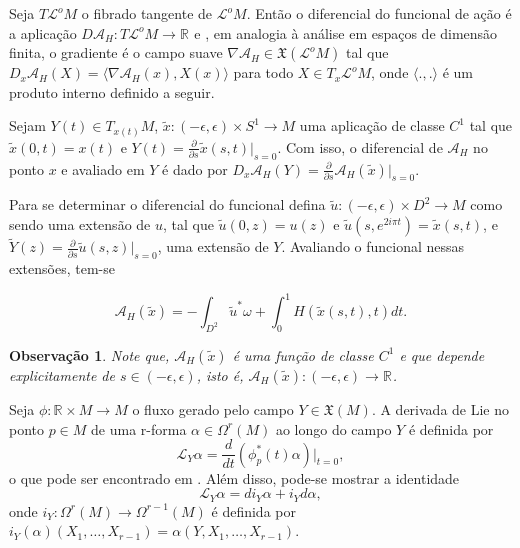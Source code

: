 \documentclass[12pt]{book}
\newtheorem{observacao}[teorema]{Observação}
\newcommand{\campossuaves}[1]{\mathfrak{X}(#1)}
\newcommand{\derivada}[2]{\frac{d #1}{d #2}}
\newcommand{\derivadaparcial}[2]{\frac{\partial #1}{\partial #2}}
\newcommand{\espacotangenteponto}[2]{T_{#1}#2}
\newcommand{\funcionalH}{\mathcal{A}_{H}}
\newcommand{\funcionalHponto}[1]{\mathcal{A}_{H}(#1)}
\newcommand{\gradientefuncional}{\nabla \funcionalH}
\newcommand{\liederivada}[1]{\mathcal{L}_{#1}}
\newcommand{\produtointerno}[2]{\langle #1, #2 \rangle}
\newcommand{\retacartesianovariedade}{\real{} \times M}
\newcommand{\real}[1]{\mathbb{R}^{#1}}
\newcommand{\reta}{\real{}}
\newcommand{\lacocontrateis}{\mathcal{L}^{o}M}
\begin{document}
	Seja $T\lacocontrateis$ o fibrado tangente de $\lacocontrateis$. Então o diferencial do funcional de ação é a aplicação $D\funcionalH: T\lacocontrateis \to \real{}$ e , em analogia à análise em espaços de dimensão finita, o gradiente é o campo suave $\gradientefuncional\in \campossuaves{\lacocontrateis}$ tal que $D_{x}\funcionalH(X) = \produtointerno{\gradientefuncional(x)}{X(x)}$ para todo $X\in \espacotangenteponto{x}{\lacocontrateis}$, onde $\produtointerno{.}{.}$ é um produto interno definido a seguir.
	
	Sejam $Y(t) \in \espacotangenteponto{x(t)}{M}$, $\tilde{x}:(-\epsilon, \epsilon)\times S^{1} \to M$  uma aplicação de classe $C^{1}$ tal que $\tilde{x}(0,t) = x(t)$ e $Y(t) = \derivadaparcial{}{s}\tilde{x}(s,t)|_{s=0}$. Com isso, o diferencial de $\funcionalH$ no ponto $x$ e avaliado em $Y$ é dado por $D_{x}\funcionalH(Y) = \derivadaparcial{}{s}\funcionalH(\tilde{x})|_{s=0}$.
	
	Para se determinar o diferencial do funcional defina $\tilde{u}:(-\epsilon, \epsilon)\times D^{2} \to M$ como sendo uma extensão de $u$, tal que $\tilde{u}(0,z) = u(z)$ e $\tilde{u}(s,e^{2i\pi t}) = \tilde{x}(s,t)$, e $\tilde{Y}(z) = \derivadaparcial{}{s}\tilde{u}(s,z)|_{s=0}$, uma extensão de $Y$. Avaliando o funcional nessas extensões, tem-se
	
	$$
	\funcionalHponto{\tilde{x}} = -\int_{D^{2}}\tilde{u}^{*}\omega + \int_{0}^{1}H(\tilde{x}(s,t),t)dt.
	$$
	
	\begin{observacao}
		Note que, $	\funcionalHponto{\tilde{x}}$ é uma função de classe $C^{1}$ e que depende explicitamente de $s\in (-\epsilon, \epsilon)$, isto é, $	\funcionalHponto{\tilde{x}}:(-\epsilon,\epsilon)\to \reta$. 
	\end{observacao}
	
	Seja $\phi:\retacartesianovariedade\to M$ o fluxo gerado pelo campo $Y\in \campossuaves{M}$. A derivada de Lie no ponto $p\in M $ de uma r-forma $\alpha \in \Omega^{r}(M)$ ao longo do campo $Y$ é definida por 
	$$
	\liederivada{Y}\alpha = \derivada{}{t}(\phi^{*}_{p}(t)\alpha)|_{t=0},
	$$ 
	o que pode ser encontrado em \cite{nakahara}. Além disso, pode-se mostrar a identidade 
	$$
	\liederivada{Y}\alpha= di_{Y}\alpha+i_{Y}d\alpha,
	$$
	onde $i_{Y}:\Omega^{r}(M)\to \Omega^{r-1}(M)$ é definida por $i_{Y}(\alpha)(X_{1}, \dots, X_{r-1}) = \alpha(Y, X_{1}, \dots, X_{r-1})$.
	
\end{document}

